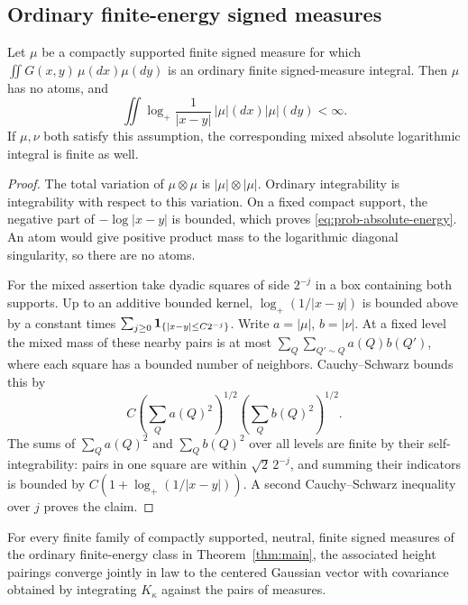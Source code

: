 \subsection{Ordinary finite-energy signed measures}

\begin{lemma}\label{lem:log-integrability}
Let \(\mu\) be a compactly supported finite signed measure for which
\(\iint G(x,y)\,\mu(dx)\mu(dy)\) is an ordinary finite signed-measure
integral. Then \(\mu\) has no atoms, and
\begin{equation}\label{eq:prob-absolute-energy}
 \iint\log_+\frac1{|x-y|}\,|\mu|(dx)|\mu|(dy)<\infty.
\end{equation}
If \(\mu,\nu\) both satisfy this assumption, the corresponding mixed
absolute logarithmic integral is finite as well.
\end{lemma}

\begin{proof}
The total variation of \(\mu\otimes\mu\) is
\(|\mu|\otimes|\mu|\). Ordinary integrability is integrability with
respect to this variation. On a fixed compact support, the negative
part of \(-\log|x-y|\) is bounded, which proves
\eqref{eq:prob-absolute-energy}. An atom would give positive product
mass to the logarithmic diagonal singularity, so there are no atoms.

For the mixed assertion take dyadic squares of side \(2^{-j}\) in a
box containing both supports. Up to an additive bounded kernel,
\(\log_+(1/|x-y|)\) is bounded above by a constant times
\(\sum_{j\ge0}\mathbf1_{\{|x-y|\le C2^{-j}\}}\).
Write \(a=|\mu|\), \(b=|\nu|\).
At a fixed level the mixed mass of these nearby pairs is at most
\(\sum_Q\sum_{Q'\sim Q}a(Q)b(Q')\), where each square has a bounded
number of neighbors. Cauchy--Schwarz bounds this by
\[
 C\left(\sum_Qa(Q)^2\right)^{1/2}
  \left(\sum_Qb(Q)^2\right)^{1/2}.
\]
The sums of \(\sum_Qa(Q)^2\) and \(\sum_Qb(Q)^2\) over all levels
are finite by their self-integrability: pairs in one square are within
\(\sqrt2\,2^{-j}\), and summing their indicators is bounded by
\(C(1+\log_+(1/|x-y|))\).
A second Cauchy--Schwarz inequality over \(j\) proves the claim.
\end{proof}

\begin{proposition}\label{prop:finite-energy}
For every finite family of compactly supported, neutral, finite signed
measures of the ordinary finite-energy class in
Theorem~\ref{thm:main}, the associated height pairings converge jointly
in law to the centered Gaussian vector with covariance obtained by
integrating \(K_\kappa\) against the pairs of measures.
\end{proposition}

